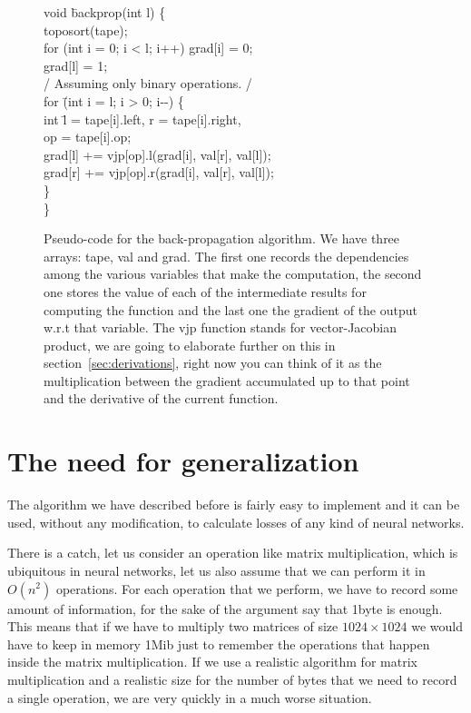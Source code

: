 \documentclass{sapthesis}
\begin{document}
\begin{figure}
\centering
\begin{minipage}{.7\textwidth}
\begin{tabbing}
void \= backprop(int l) \{\+\\
    toposort(tape);\\
    for (int i = 0; i \textless{} l; i++) grad[i] = 0;\\
    grad[l] = 1;\\
    /\textasteriskcentered{}
    Assuming only binary operations.
    \textasteriskcentered/\\
    for \=(int i = l; i \textgreater{} 0; i-{}-) \{\+\\
        int \=l = tape[i].left, r = tape[i].right, \\
            \>op = tape[i].op;\\
        grad[l] += vjp[op].l(grad[i], val[r], val[l]);\\
        grad[r] += vjp[op].r(grad[i], val[r], val[l]);\-\\
    \}\-\\
\}\\
\end{tabbing}
\end{minipage}
\caption{Pseudo-code for the back-propagation algorithm. We have three arrays:
tape, val and grad. The first one records the dependencies among the various
variables that make the computation, the second one stores the value of each of
the intermediate results for computing the function and the last one the
gradient of the output w.r.t that variable. The vjp function stands for
vector-Jacobian product, we are going to elaborate further on this in
section~\ref{sec:derivations}, right now you can think of it as the
multiplication between the gradient accumulated up to that point and the
derivative of the current function.}
\label{fig:pseudo}
\end{figure}

\section{The need for generalization}

The algorithm we have described before is fairly easy to implement and it can be
used, without any modification, to calculate losses of any kind of neural
networks.

There is a catch, let us consider an operation like matrix multiplication, which
is ubiquitous in neural networks, let us also assume that we can perform it in
\(O(n^2)\) operations. For each operation that we perform, we have to record some
amount of information, for the sake of the argument say that 1byte
is enough. This means that if we have to multiply two matrices of size \(1024
\times 1024\) we would have to keep in memory 1Mib just to remember the
operations that happen inside the matrix multiplication. If we use a realistic
algorithm for matrix multiplication and a realistic size for the number of bytes
that we need to record a single operation, we are very quickly in a much worse
situation.
\end{document}
